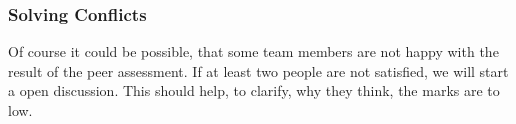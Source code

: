 \subsubsection{Solving Conflicts}

Of course it could be possible, that some team members are not happy with the result of the peer assessment. If at least two people are not satisfied, we will start a open discussion. This should help, to clarify, why they think, the marks are to low. 
